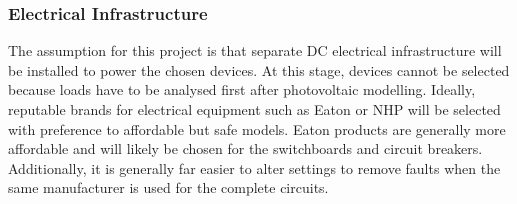 \subsubsection{Electrical Infrastructure}

The assumption for this project is that separate DC electrical infrastructure will be installed to power the chosen devices. At this stage, devices cannot be selected because loads have to be analysed first after photovoltaic modelling. Ideally, reputable brands for electrical equipment such as Eaton or NHP will be selected with preference to affordable but safe models. Eaton products are generally more affordable and will likely be chosen for the switchboards and circuit breakers. Additionally, it is generally far easier to alter settings to remove faults when the same manufacturer is used for the complete circuits.  
       
  
 